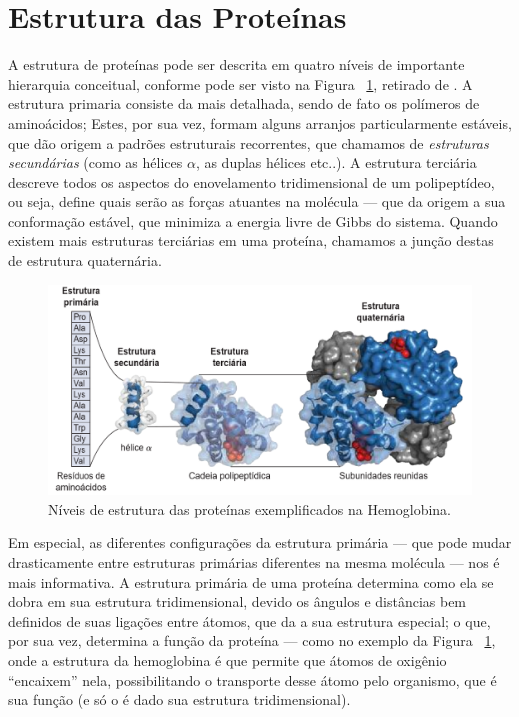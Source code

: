 \section*{Estrutura das Proteínas}
A estrutura de proteínas pode ser descrita em quatro níveis de importante hierarquia conceitual, conforme pode ser visto na Figura ~\ref{fig:protest}, retirado de \cite{bioquimicaLehninger}. A estrutura primaria consiste da mais detalhada, sendo de fato os polímeros de aminoácidos; Estes, por sua vez, formam alguns arranjos particularmente estáveis, que dão origem a padrões estruturais recorrentes, que chamamos de \textit{estruturas secundárias} (como as hélices $\alpha$, as duplas hélices etc..). A estrutura terciária descreve todos os aspectos do enovelamento tridimensional de um polipeptídeo, ou seja, define quais serão as forças atuantes na molécula --- que da origem a sua conformação estável, que minimiza a energia livre de Gibbs do sistema. Quando existem mais estruturas terciárias em uma proteína, chamamos a junção destas de estrutura quaternária.	

\begin{figure}[H]
	\begin{center}
		\includegraphics[width=0.9\linewidth]{secProteins/figures/protest.png}
	\end{center}
	\caption{Níveis de estrutura das proteínas exemplificados na Hemoglobina.}
	\label{fig:protest}
\end{figure}

Em especial, as diferentes configurações da estrutura primária --- que pode mudar drasticamente entre estruturas primárias diferentes na mesma molécula --- nos é mais informativa. A estrutura primária de uma proteína determina como ela se dobra em sua estrutura tridimensional, devido os ângulos e distâncias bem definidos de suas ligações entre átomos, que da a sua estrutura especial; o que, por sua vez, determina a função da proteína --- como no exemplo da Figura ~\ref{fig:protest}, onde a estrutura da hemoglobina é que permite que átomos de oxigênio ``encaixem'' nela, possibilitando o transporte desse átomo pelo organismo, que é sua função (e só o é dado sua estrutura tridimensional). 

